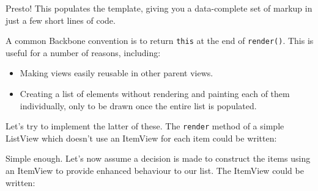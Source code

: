 \documentclass[9pt]{book}
\newenvironment{Shaded}{}{}
\newcommand{\KeywordTok}[1]{\textcolor[rgb]{0.00,0.44,0.13}{\textbf{{#1}}}}
\newcommand{\DataTypeTok}[1]{\textcolor[rgb]{0.56,0.13,0.00}{{#1}}}
\newcommand{\CommentTok}[1]{\textcolor[rgb]{0.38,0.63,0.69}{\textit{{#1}}}}
\newcommand{\OtherTok}[1]{\textcolor[rgb]{0.00,0.44,0.13}{{#1}}}
\newcommand{\FunctionTok}[1]{\textcolor[rgb]{0.02,0.16,0.49}{{#1}}}
\newcommand{\NormalTok}[1]{{#1}}
\begin{document}
Presto! This populates the template, giving you a data-complete set of
markup in just a few short lines of code.

A common Backbone convention is to return \texttt{this} at the end of
\texttt{render()}. This is useful for a number of reasons, including:

\begin{itemize}
\itemsep1pt\parskip0pt
\item
  Making views easily reusable in other parent views.
\item
  Creating a list of elements without rendering and painting each of
  them individually, only to be drawn once the entire list is populated.
\end{itemize}

Let's try to implement the latter of these. The \texttt{render} method
of a simple ListView which doesn't use an ItemView for each item could
be written:

\begin{Shaded}
\end{Shaded}

Simple enough. Let's now assume a decision is made to construct the
items using an ItemView to provide enhanced behaviour to our list. The
ItemView could be written:

\begin{Shaded}
\end{Shaded}
\end{document}
